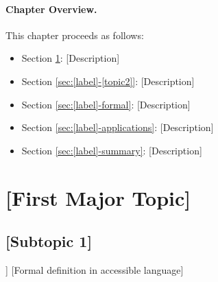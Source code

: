 \begin{center}
\end{center}

\paragraph{Chapter Overview.}
This chapter proceeds as follows:
\begin{itemize}
    \item Section \ref{sec:[label]-[topic1]}: [Description]
    \item Section \ref{sec:[label]-[topic2]}: [Description]
    \item Section \ref{sec:[label]-formal}: [Description]
    \item Section \ref{sec:[label]-applications}: [Description]
    \item Section \ref{sec:[label]-summary}: [Description]
\end{itemize}



\section{[First Major Topic]}
\label{sec:[label]-[topic1]}



\subsection{[Subtopic 1]}
\label{sec:[label]-[subtopic1]}

\begin{definition}[[Concept Name]]
[Formal definition in accessible language]
\begin{equation}
[Key equation]
\label{eq:[name]}
\end{equation}
\end{definition}

